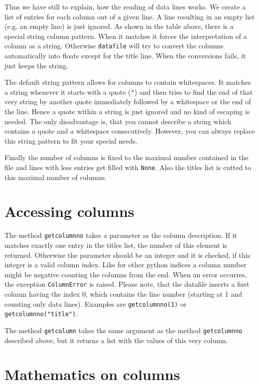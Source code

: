 Thus we have still to explain, how the reading of data lines works. We
create a list of entries for each column out of a given line. A line
resulting in an empty list (e.g. an empty line) is just ignored. As
shown in the table above, there is a special string column pattern.
When it matches it forces the interpretation of a column as a string.
Otherwise \verb|datafile| will try to convert the columns
automatically into floats except for the title line. When the
conversions fails, it just keeps the string.

The default string pattern allows for columns to contain whitespaces.
It matches a string whenever it starts with a quote (\verb|"|) and
then tries to find the end of that very string by another quote
immediately followed by a whitespace or the end of the line. Hence a
quote within a string is just ignored and no kind of escaping is
needed. The only disadvantage is, that you cannot describe a string
which contains a quote and a whitespace consecutively. However, you
can always replace this string pattern to fit your special needs.

Finally the number of columns is fixed to the maximal number contained
in the file and lines with less entries get filled with \verb|None|.
Also the titles list is cutted to this maximal number of columns.

\section{Accessing columns}

The method \verb|getcolumnno| takes a parameter as the column
description. If it matches exactly one entry in the titles list, the
number of this element is returned. Otherwise the parameter should be
an integer and it is checked, if this integer is a valid column index.
Like for other python indices a column number might be negative
counting the columns from the end. When an error occurres, the
exception \verb|ColumnError| is raised. Please note, that the datafile
inserts a first column having the index 0, which contains the line
number (starting at 1 and counting only data lines). Examples are
\verb|getcolumnno(1)| or \verb|getcolumnno("title")|.

The method \verb|getcolumn| takes the same argument as the method
\verb|getcolumnno| described above, but it returns a list with the
values of this very column.

\section{Mathematics on columns}

